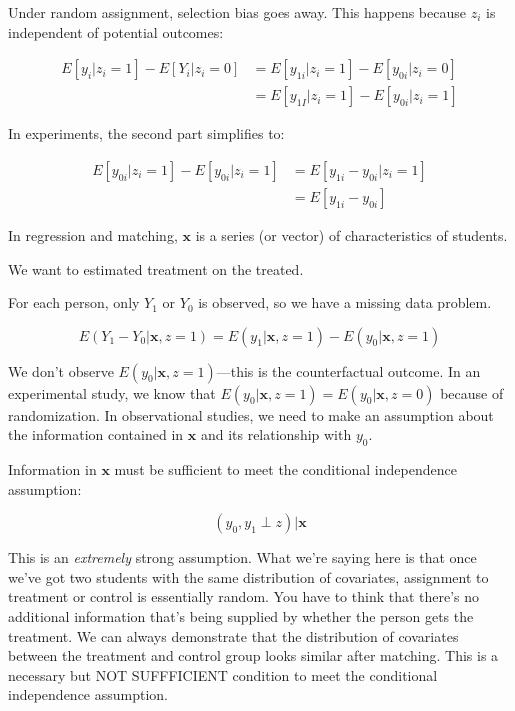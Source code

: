 \documentclass[12pt]{article}
\newcommand{\boldx}{\boldsymbol{x}}
\begin{document}
Under random assignment, selection bias goes away. This happens
because $z_i$ is independent of potential outcomes:

\begin{align*}
  E[y_i|z_i=1]-E[Y_i|z_i=0]&=E[y_{1i}|z_i=1]-E[y_{0i}|z_i=0]\\
                           &=E[y_{1I}|z_i=1]-E[y_{0i}|z_i=1]
\end{align*}

In experiments, the second part simplifies to: 

\begin{align*}
E[y_{0i}|z_i=1]-E[y_{0i}|z_i=1]&=E[y_{1i}-y_{0i}|z_i=1] \\
                               &=E[y_{1i}-y_{0i}]
\end{align*}

In regression and matching, $\boldx$ is  a series (or vector) of characteristics of students. 

We want to estimated treatment on the treated.

For each person, only $Y_1$ or $Y_0$ is observed, so we have a missing
data problem. 

\begin{equation*}
E(Y_1-Y_0|\boldx,z=1)=E(y_1|\boldx,z=1)-E(y_0|\boldx,z=1)
\end{equation*}

We don't observe $E(y_0|\boldx,z=1)$---this is the counterfactual
outcome. In an experimental study, we know that
$E(y_0|\boldx,z=1)=E(y_0|\boldx,z=0)$ because of randomization. In
observational studies, we need to make an assumption about the
information contained in $\boldx$ and its relationship with $y_0$. 

Information in $\boldx$ must be sufficient to meet the conditional independence assumption:

\begin{equation*}
(y_0, y_1\perp z)|\boldx
\end{equation*}

This is an \textit{extremely} strong assumption. What we're saying
here is that once we've got two students with the same distribution of
covariates, assignment to treatment or control is essentially
random. You have to think that there's no additional information that's
being supplied by whether the person gets the treatment. We can always
demonstrate that the distribution of covariates between the treatment
and control group looks similar after matching. This is a necessary
but NOT SUFFFICIENT condition to meet the conditional independence
assumption. 
\end{document}
